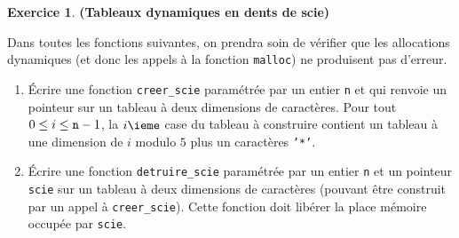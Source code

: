 \documentclass[12pt]{article}
\theoremstyle{definition}
\newtheorem{Exercice}{Exercice}
\begin{document}
\begin{Exercice} {\bf (Tableaux dynamiques en dents de scie)}\smallskip

Dans toutes les fonctions suivantes, on prendra soin de vérifier que
les allocations dynamiques (et donc les appels à la fonction {\tt malloc})
ne produisent pas d'erreur.

\begin{enumerate}
    \item Écrire une fonction {\tt creer\_scie} paramétrée par un entier
    {\tt n} et qui renvoie un pointeur sur un tableau à deux dimensions
    de caractères. Pour tout $0 \leq i \leq {\tt n} - 1$, la $i\ieme$
    case du tableau à construire contient un tableau à une dimension de
    $i$ modulo $5$ plus un caractères {\tt '*'}.
    \smallskip

    \item Écrire une fonction {\tt detruire\_scie} paramétrée par un
    entier {\tt n} et un pointeur {\tt scie} sur un tableau à deux
    dimensions de caractères (pouvant être construit par un appel à
    {\tt creer\_scie}). Cette fonction doit libérer la place mémoire
    occupée par {\tt scie}.
\end{enumerate}
\end{Exercice}
\bigskip
\end{document}
